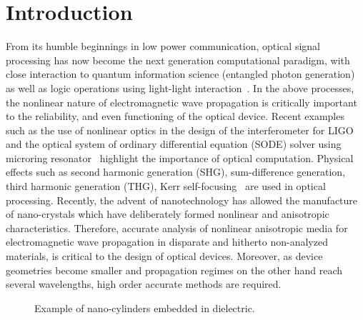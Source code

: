 \documentclass{article}[12pt]
\theoremstyle{plain}
\begin{document}
\section{Introduction}
\label{sec:introduction}
From its humble beginnings in low power communication, optical
signal processing has now become the next generation computational
paradigm, with close interaction to quantum information science (entangled photon
generation) as well as logic operations using light-light 
interaction~\cite{boyd2003nonlinear, boyd2012contemporary,agrawal2007nonlinear,agrawal2001applications,bloembergen1996nonlinear,zernike2006applied}.
In the above processes, the nonlinear nature of electromagnetic wave propagation
is critically important to the reliability, and even functioning of the optical device.
Recent examples such as the use of nonlinear optics in the design of the interferometer for LIGO~\cite{abramovici1992ligo}
and the optical system of ordinary differential equation (SODE) solver using microring resonator~\cite{vernon2015spontaneous}
highlight the importance of optical computation.
Physical effects such as second harmonic generation (SHG), sum-difference generation,
third harmonic generation (THG), Kerr self-focusing~\cite{bloembergen1996nonlinear}
are used in optical processing. Recently, the advent of nanotechnology has allowed
the manufacture of nano-crystals which have deliberately formed nonlinear and anisotropic characteristics.
Therefore, accurate analysis of nonlinear anisotropic media for electromagnetic wave propagation
in disparate and hitherto non-analyzed materials,
is critical to the design of optical devices. Moreover, as device geometries become smaller
and propagation regimes on the other hand reach several wavelengths, high order accurate methods
are required. 

\begin{figure}
\begin{center}
\caption{Example of nano-cylinders embedded in dielectric.}
\label{fig:nano-cylinder}
\end{center}
\end{figure}
\end{document}
